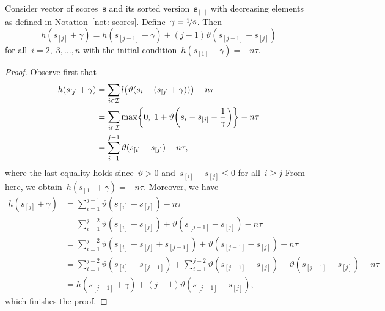\begin{lemma}
  Consider vector of scores~$\bm{s}$ and its sorted version~$\bm{s}_{[\cdot]}$ with decreasing elements as defined in Notation~\ref{not: scores}. Define~$\gamma = \nicefrac{1}{\vartheta}$. Then 
  \begin{equation}\label{eq:update_h}
    h(s_{[j]} + \gamma) = h(s_{[j - 1]} + \gamma) + (j - 1) \vartheta(s_{[j - 1]} - s_{[j]})
  \end{equation}
  for all~$i = 2, \; 3, \ldots, n$ with the initial condition~$h(s_{[1]} + \gamma) = -n\tau$.
\end{lemma}
\begin{proof}
Observe first that
\begin{equation*}
  \begin{aligned}
    h(s_{[j]}+\gamma)
      & = \sum_{i \in \I} l\Brac{\vartheta(s_i - (s_{[j]} + \gamma))} - n\tau \\
      & = \sum_{i \in \I} \max\Brac[c]{0,\; 1 + \vartheta\Brac{s_i - s_{[j]} - \frac{1}{\gamma}}} - n\tau \\
      & = \sum_{i = 1}^{j - 1} \vartheta(s_{[i]} - s_{[j]}) - n\tau,
  \end{aligned}
\end{equation*}
where the last equality holds since~$\vartheta > 0$ and~$s_{[i]} - s_{[j]} \le 0$ for all~$i \geq j$
From here, we obtain~$h(s_{[1]} + \gamma) = -n\tau$. Moreover, we have
\begin{equation*}
  \begin{aligned}
    h(s_{[j]} + \gamma)
    & = \sum_{i = 1}^{j - 1} \vartheta(s_{[i]} - s_{[j]}) - n\tau \\
    & = \sum_{i = 1}^{j - 2} \vartheta(s_{[i]} - s_{[j]}) + \vartheta(s_{[j-1]} - s_{[j]}) - n\tau \\
    & = \sum_{i = 1}^{j - 2} \vartheta(s_{[i]} - s_{[j]} \pm s_{[j - 1]}) + \vartheta(s_{[j-1]} - s_{[j]}) - n\tau \\
    & = \sum_{i = 1}^{j - 2} \vartheta(s_{[i]} - s_{[j - 1]}) + \sum_{i = 1}^{j - 2} \vartheta(s_{[j - 1]} - s_{[j]}) + \vartheta(s_{[j - 1]} - s_{[j]}) - n\tau \\
    & = h(s_{[j - 1]} + \gamma) + (j - 1) \vartheta(s_{[j - 1]} - s_{[j]}),
  \end{aligned}
\end{equation*}
which finishes the proof.
\end{proof}

